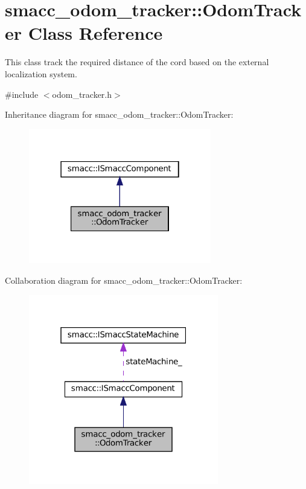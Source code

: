 \hypertarget{classsmacc__odom__tracker_1_1OdomTracker}{}\section{smacc\+\_\+odom\+\_\+tracker\+:\+:Odom\+Tracker Class Reference}
\label{classsmacc__odom__tracker_1_1OdomTracker}


This class track the required distance of the cord based on the external localization system.  




{\ttfamily \#include $<$odom\+\_\+tracker.\+h$>$}



Inheritance diagram for smacc\+\_\+odom\+\_\+tracker\+:\+:Odom\+Tracker\+:
\nopagebreak
\begin{figure}[H]
\begin{center}
\leavevmode
\includegraphics[width=226pt]{classsmacc__odom__tracker_1_1OdomTracker__inherit__graph}
\end{center}
\end{figure}


Collaboration diagram for smacc\+\_\+odom\+\_\+tracker\+:\+:Odom\+Tracker\+:
\nopagebreak
\begin{figure}[H]
\begin{center}
\leavevmode
\includegraphics[width=235pt]{classsmacc__odom__tracker_1_1OdomTracker__coll__graph}
\end{center}
\end{figure}
